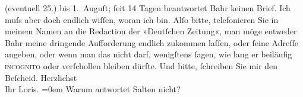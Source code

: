 \begin{ledgroupsized}[t]{13cm}
                    (eventuell 25.) bis 1. Auguſt; ſeit 14 Tagen
                    beantwortet Bahr keinen Brief. Ich muſs aber
                    doch endlich wiſſen, {\pb}woran
                    ich bin. Alſo bitte, telefonieren Sie in meinem Namen an die Redaction der »Deutſchen Zeitung«, man möge entweder Bahr meine dringende Aufforderung endlich
                    zukommen laſſen, oder ſeine Adreſſe angeben, oder wenn man das nicht darf,
                    wenigſtens ſagen, wie lang er beiläufig \textsc{incognito} oder
                    verſchollen bleiben dürfte. Und bitte, ſchreiben Sie mir  den Beſcheid.\pend
           \pstart
           Herzlichst{\\[\baselineskip]}Ihr \spacefill\mbox{Loris.}\pend
           \leftskip=0em{}\pstart
           \noindent{}Warum antwortet Salten nicht?\pend
                     \endnumbering{}\end{ledgroupsized}  \newcommand{\dateiname}{L00238}\newcommand{\titel}{Hugo von Hofmannsthal an Arthur Schnitzler, 19. 7. 1893}\newcommand{\editorInnen}{ Martin Anton Müller und Gerd-Hermann Susen}
      
